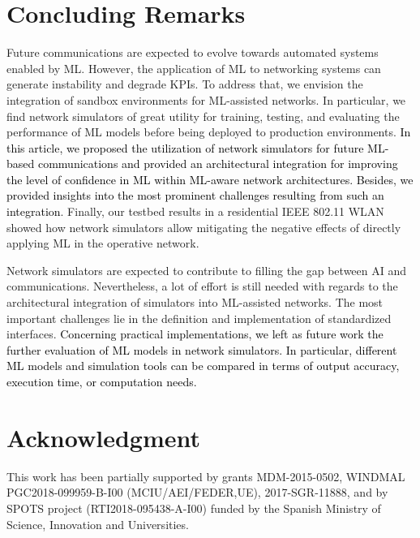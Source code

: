 \documentclass[journal]{IEEEtran}
\begin{document}
	\section{Concluding Remarks}
	Future communications are expected to evolve towards automated systems enabled by ML. However, the application of ML to networking systems can generate instability and degrade KPIs. To address that, we envision the integration of sandbox environments for ML-assisted networks. In particular, we find network simulators of great utility for training, testing, and evaluating the performance of ML models before being deployed to production environments. \textcolor{black}{In this article, we proposed the utilization of network simulators for future ML-based communications and provided an architectural integration for improving the level of confidence in ML within ML-aware network architectures. Besides, we provided insights into the most prominent challenges resulting from such an integration}. Finally, our testbed results in a residential IEEE 802.11 WLAN showed how network simulators allow mitigating the negative effects of directly applying ML in the operative network. 
		
	Network simulators are expected to contribute to filling the gap between AI and communications. Nevertheless, a lot of effort is still needed with regards to the architectural integration of simulators into ML-assisted networks. The most important challenges lie in the definition and implementation of standardized interfaces. \textcolor{black}{Concerning practical implementations, we left as future work the further evaluation of ML models in network simulators. In particular, different ML models and simulation tools can be compared in terms of output accuracy, execution time, or computation needs.}

	\section*{Acknowledgment}
	This work has been partially supported by grants MDM-2015-0502, WINDMAL PGC2018-099959-B-I00 (MCIU/AEI/FEDER,UE), 2017-SGR-11888, and by SPOTS project (RTI2018-095438-A-I00) funded by the Spanish Ministry of Science, Innovation and Universities.
	
	\ifCLASSOPTIONcaptionsoff
	\newpage
	\fi
	
\end{document}
